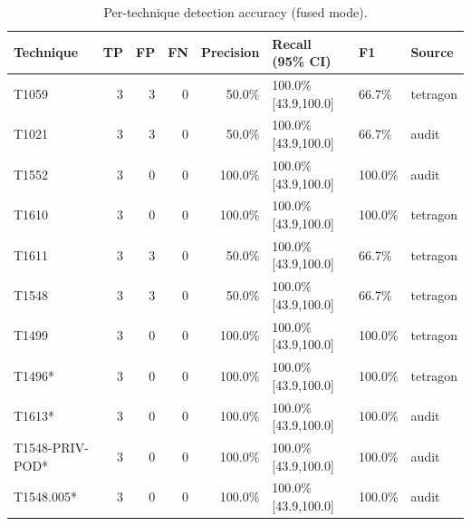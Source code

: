 \begin{table}[t]
\centering
\caption{Per-technique detection accuracy (fused mode).}
\label{tab:detection-accuracy}
\begin{tabular}{lrrrrlll}
\toprule
Technique & TP & FP & FN & Precision & Recall (95\% CI) & F1 & Source \\
\midrule
T1059 & 3 & 3 & 0 & 50.0\% & 100.0\% [43.9,100.0] & 66.7\% & tetragon \\
T1021 & 3 & 3 & 0 & 50.0\% & 100.0\% [43.9,100.0] & 66.7\% & audit \\
T1552 & 3 & 0 & 0 & 100.0\% & 100.0\% [43.9,100.0] & 100.0\% & audit \\
T1610 & 3 & 0 & 0 & 100.0\% & 100.0\% [43.9,100.0] & 100.0\% & tetragon \\
T1611 & 3 & 3 & 0 & 50.0\% & 100.0\% [43.9,100.0] & 66.7\% & tetragon \\
T1548 & 3 & 3 & 0 & 50.0\% & 100.0\% [43.9,100.0] & 66.7\% & tetragon \\
T1499 & 3 & 0 & 0 & 100.0\% & 100.0\% [43.9,100.0] & 100.0\% & tetragon \\
T1496* & 3 & 0 & 0 & 100.0\% & 100.0\% [43.9,100.0] & 100.0\% & tetragon \\
T1613* & 3 & 0 & 0 & 100.0\% & 100.0\% [43.9,100.0] & 100.0\% & audit \\
T1548-PRIV-POD* & 3 & 0 & 0 & 100.0\% & 100.0\% [43.9,100.0] & 100.0\% & audit \\
T1548.005* & 3 & 0 & 0 & 100.0\% & 100.0\% [43.9,100.0] & 100.0\% & audit \\
\bottomrule
\end{tabular}
\end{table}
